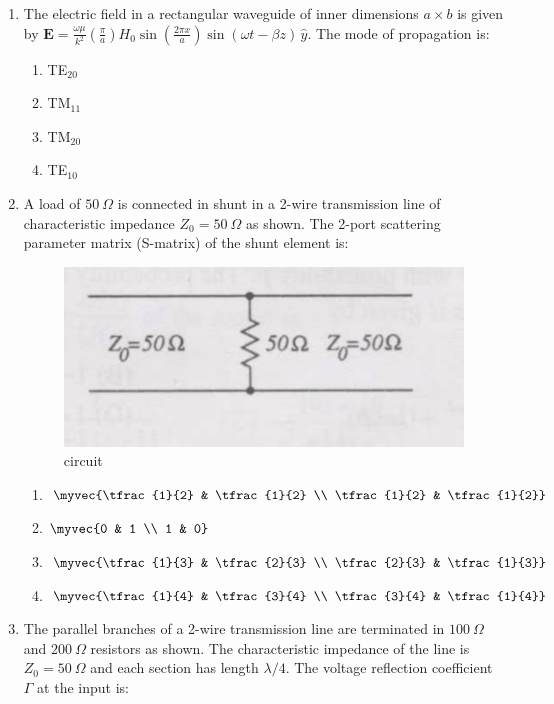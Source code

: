 \documentclass[journal,12pt,onecolumn]{IEEEtran}
\theoremstyle{remark}
\begin{document}
\begin{enumerate}
\item The electric field in a rectangular waveguide of inner dimensions $a\times b$ is given by
$
\mathbf{E} = \frac{\omega\mu}{k^2} \left(\frac{\pi}{a}\right) H_0 \sin\left(\frac{2\pi x}{a}\right) \sin(\omega t - \beta z)\,\hat{y}.
$
The mode of propagation is: 
\hfill{}
\begin{multicols}{4}
\begin{enumerate}
  \item TE$_{20}$
  \item TM$_{11}$
  \item TM$_{20}$
  \item TE$_{10}$
\end{enumerate}
\end{multicols}

\item A load of $50~\Omega$ is connected in shunt in a 2-wire transmission line of characteristic impedance $Z_0=50~\Omega$ as shown. The 2-port scattering parameter matrix (S-matrix) of the shunt element is: 

\begin{figure}[H]
    \centering
    \includegraphics[width=0.4\linewidth]{Q67.jpg}
    \caption{circuit}
    \label{fig:full_wave}
\end{figure}
\hfill{}

\begin{multicols}{4}
\begin{enumerate}
    \item $\myvec{\tfrac{1}{2} & \tfrac{1}{2} \\ \tfrac{1}{2} & \tfrac{1}{2}}$
    \item $\myvec{0 & 1 \\ 1 & 0}$
    \item $\myvec{\tfrac{1}{3} & \tfrac{2}{3} \\ \tfrac{2}{3} & \tfrac{1}{3}}$
    \item $\myvec{\tfrac{1}{4} & \tfrac{3}{4} \\ \tfrac{3}{4} & \tfrac{1}{4}}$
\end{enumerate}
\end{multicols}

\item The parallel branches of a 2-wire transmission line are terminated in $100~\Omega$ and $200~\Omega$ resistors as shown. The characteristic impedance of the line is $Z_0=50~\Omega$ and each section has length $\lambda/4$. The voltage reflection coefficient $\Gamma$ at the input is: 


\end{enumerate}
\end{document}
